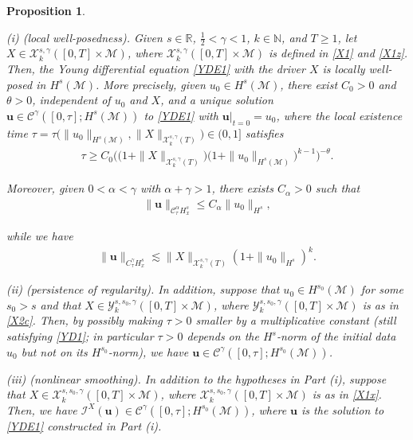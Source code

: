\documentclass[letterpaper, 11pt,  reqno]{amsart}
\newtheorem{proposition}[theorem]{Proposition}
\newcommand{\1}{\hspace{0.5mm}\text{I}\hspace{0.5mm}}
\newcommand{\I}{\mathcal{I}}
\newcommand{\noi}{\noindent}
\newcommand{\R}{\mathbb{R}}
\newcommand{\CC}{\mathcal{C}}
\newcommand{\al}{\alpha}
\newcommand{\g}{\gamma}
\newcommand{\ta}{\theta}
\newcommand{\les}{\lesssim}
\newcommand{\M}{\mathcal{M}}
\newcommand{\N}{\mathbb{N}}
\newcommand{\cC}{\mathcal{C}}
\newcommand{\cX}{\mathcal{X}}
\newcommand{\cY}{\mathcal{Y}}
\newcommand{\uu}{\mathbf{u}}
\numberwithin{equation}{section}
\numberwithin{theorem}{section}
\begin{document}
\begin{proposition}
\label{PROP:main}

\textup{(i) (local well-posedness).}
Given   $s \in \R$, $\frac 12 < \g < 1$,  $k \in \N$, and $T \ge 1$, 
let     $X \in \cX^{s, \g}_k([0, T]\times \M)$, 
where $ \cX^{s, \g}_k([0, T]\times \M)$ is  defined  in \eqref{X1}
and \eqref{X1z}.
Then, 
 the Young differential equation \eqref{YDE1} with 
 the driver $X$ 
is locally well-posed in $H^s(\M)$.
More precisely, given  $u_0\in H^s(\M)$, 
there exist $C_0 >0$ and   $\ta>0$, independent of $u_0$ and $X$, 
and 
 a unique solution $\uu \in \cC^\g([0, \tau]; H^s(\M))$
   to 
 \eqref{YDE1}  
with $\uu|_{t= 0} = u_0$, where the local existence time $\tau = 
\tau\big(\|u_0\|_{H^s(\M)}, \|X\|_{\cX^{s, \g}_k(T)}\big) \in (0, 1]$
satisfies 
\begin{align}
\tau \ge  C_0 
\Big(\big(1+ \|X\|_{\cX^{s,\g}_k(T)} \big) \big(1+ \|u_0\|_{H^s(\M)}\big)^{k-1}\Big)^{-\ta}.
\label{YD1}
\end{align}


\noi
Moreover, given $0 < \al < \g$
with $\al + \g > 1$, 
there exists $C_\al > 0$ 
such that 
\begin{align}
\| \uu \|_{\CC^\al_\tau H^s_x}\le C_\al \|u_0\|_{H^s}, 
\label{YD1a}
\end{align}


\noi
while we have
\begin{align}
\| \uu \|_{C^\g_\tau H^s_x}\les \|X\|_{\cX^{s,\g}_k(T)}  (1+\|u_0\|_{H^s})^k.
\label{YD1b}
\end{align}



\smallskip

\noi
\textup{(ii) (persistence of regularity).}
In addition, suppose that $u_0 \in H^{s_0}(\M)$ for some $s_0 > s$
and that  $X \in \cY^{s, s_0, \g}_k([0, T]\times \M)$, 
where $\cY^{s, s_0, \g}_k([0, T]\times \M)$  is  as in \eqref{X2c}.
Then, 
by possibly making $\tau > 0$ smaller by a multiplicative constant 
\textup{(}still satisfying \eqref{YD1}\textup{;} in particular $\tau > 0$
depends on the $H^s$-norm of the initial data $u_0$
but not on its $H^{s_0}$-norm\textup{)}, 
we have $\uu \in \cC^\g([0, \tau]; H^{s_0}(\M))$.


\smallskip

\noi
\textup{(iii) (nonlinear smoothing).}
In addition to the hypotheses in Part (i), 
suppose  that  $X \in \cX^{s, s_0, \g}_k([0, T]\times \M)$, 
where $\cX^{s, s_0, \g}_k([0, T]\times \M)$  is  as in \eqref{X1x}.
Then, we have
 $\I^X(\uu) \in \cC^\g([0, \tau]; H^{s_0}(\M))$, 
 where $\uu$ is the solution to \eqref{YDE1}
 constructed in Part (i).





\end{proposition}
\end{document}
